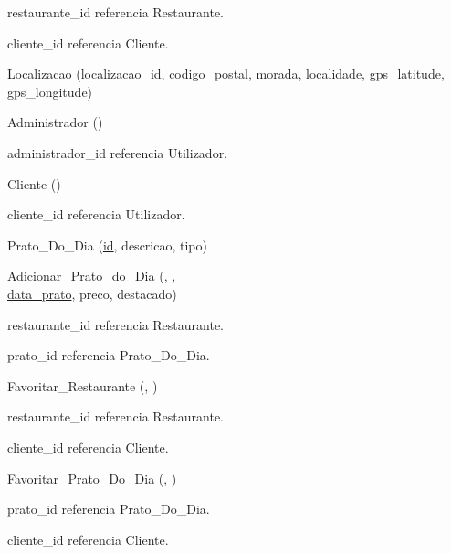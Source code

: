 \documentclass[a4paper,12pt]{report}
\begin{document}
\hspace*{1.5cm} restaurante\_id referencia Restaurante.

\hspace*{1.5cm} cliente\_id referencia Cliente.

\medskip

Localizacao (\underline{localizacao\_id}, \underline{codigo\_postal}, morada, localidade, gps\_latitude, gps\_longitude)

\medskip

Administrador (\underline{})

\hspace*{1.5cm} administrador\_id referencia Utilizador.

\medskip

Cliente (\underline{})

\hspace*{1.5cm} cliente\_id referencia Utilizador.

\medskip

Prato\_Do\_Dia (\underline{id}, descricao, tipo)

\medskip

Adicionar\_Prato\_do\_Dia (\underline{}, \underline{},\\ \underline{data\_prato}, preco, destacado)

\hspace*{1.5cm} restaurante\_id referencia Restaurante.

\hspace*{1.5cm} prato\_id referencia Prato\_Do\_Dia.

\medskip

Favoritar\_Restaurante (\underline{}, \underline{})

\hspace*{1.5cm} restaurante\_id referencia Restaurante.

\hspace*{1.5cm} cliente\_id referencia Cliente.

\medskip

Favoritar\_Prato\_Do\_Dia (\underline{}, \underline{})

\hspace*{1.5cm} prato\_id referencia Prato\_Do\_Dia.

\hspace*{1.5cm} cliente\_id referencia Cliente.
\end{document}

